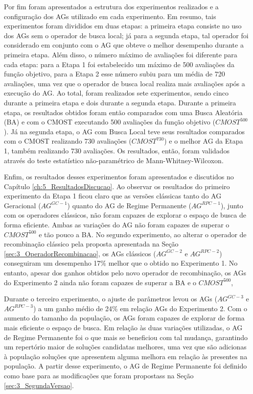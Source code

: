 Por fim foram apresentados a estrutura dos experimentos realizados e a configuração dos AGs utilizado em cada experimento. Em resumo, tais experimentos foram divididos em duas etapas: a primeira etapa consiste no uso dos AGs sem o operador de busca local; já para a segunda etapa, tal operador foi considerado em conjunto com o AG que obteve o melhor desempenho durante a primeira etapa. Além disso, o número máximo de avaliações foi diferente para cada etapa: para a Etapa 1 foi estabelecido um máximo de 500 avaliações da função objetivo, para a Etapa 2 esse número subiu para um média de 720 avaliações, uma vez que o operador de busca local realiza mais avaliações após a execução do AG. Ao total, foram realizados sete experimentos, sendo cinco durante a primeira etapa e dois durante a segunda etapa. Durante a primeira etapa, os resultados obtidos foram então comparados com uma Busca Aleatória (BA) e com o CMOST executando 500 avaliações da função objetivo ($CMOST^{500}$). Já na segunda etapa, o AG com Busca Local teve seus resultados comparados com o CMOST realizando 730 avaliações ($CMOST^{730}$) e o melhor AG da Etapa 1, também realizando 730 avaliações. Os resultados, então, foram validados através do teste estatístico não-paramétrico de Mann-Whitney-Wilcoxon. 

Enfim, os resultados desses experimentos foram apresentados e discutidos no Capítulo \ref{ch:5_ResultadosDiscucao}. Ao observar os resultados do primeiro experimento da Etapa 1 ficou claro que as versões clássicas tanto do AG Geracional ($AG^{GC-1}$) quanto do AG de Regime Permanente ($AG^{RPC-1}$), junto com os operadores clássicos, não foram capazes de explorar o espaço de busca de forma eficiente.  Ambas as variações do AG não foram capazes de superar o $CMOST^{500}$ e tão pouco a BA. No segundo experimento, ao alterar o operador de recombinação clássico pela proposta apresentada na Seção \ref{sec:3_OperadorRecombinacao}, os AGs clássicos ($AG^{GC-2}$ e $AG^{RPC-2}$) conseguiram um desempenho 17\% melhor que o obtido no Experimento 1. No entanto, apesar dos ganhos obtidos pelo novo operador de recombinação, os AGs do Experimento 2 ainda não foram capazes de superar a BA e o $CMOST^{500}$, 

Durante o terceiro experimento, o ajuste de parâmetros levou os AGs ($AG^{GC-3}$ e $AG^{RPC-3}$) a um ganho médio de 24\% em relação AGs do Experimento 2. Com o aumento do tamanho da população, os AGs foram capazes de explorar de forma mais eficiente o espaço de busca. Em relação às duas variações utilizadas, o AG de Regime Permanente foi o que mais se beneficiou com tal mudança, garantindo um repertório maior de soluções candidatas melhores, uma vez que são adicionas à população soluções que apresentem alguma melhora em relação às presentes na população. A partir desse experimento, o AG de Regime Permanente foi definido como base para as modificações que foram propostass na Seção \ref{sec:3_SegundaVersao}. 

